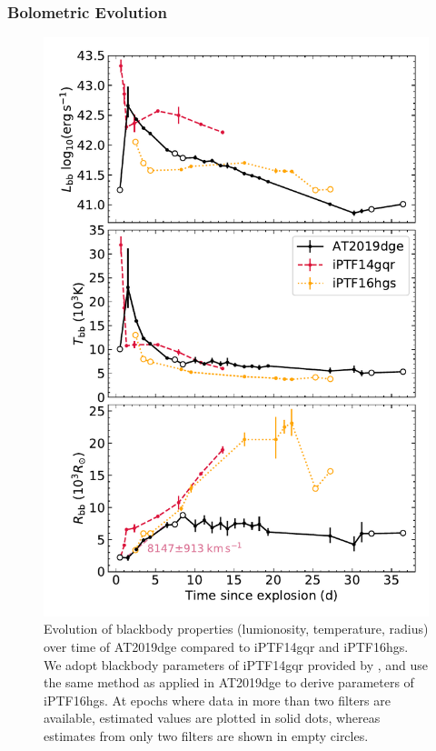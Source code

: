 \documentclass[twocolumn]{aastex63}
\begin{document}
\begin{CJK*}{UTF8}{gbsn}
\subsubsection{Bolometric Evolution}
\begin{figure}[!htbp] 
	\centering
	\includegraphics[width=\columnwidth]{figures/Tbb_Rbb.pdf}
	\caption{Evolution of blackbody properties (lumionosity, temperature, radius) over time of 
		AT2019dge compared to iPTF14gqr and iPTF16hgs. We adopt blackbody parameters of iPTF14gqr 
		provided by \citet{De2018}, and use the same method as applied in AT2019dge to derive 
		parameters of iPTF16hgs. At epochs where data in more than two filters are available, estimated 
		values are plotted in solid dots, whereas estimates from only two filters are shown in empty 
		circles.}
	\label{fig:Tbb_Rbb_Lbb}

\end{figure}
\end{CJK*}
\end{document}
